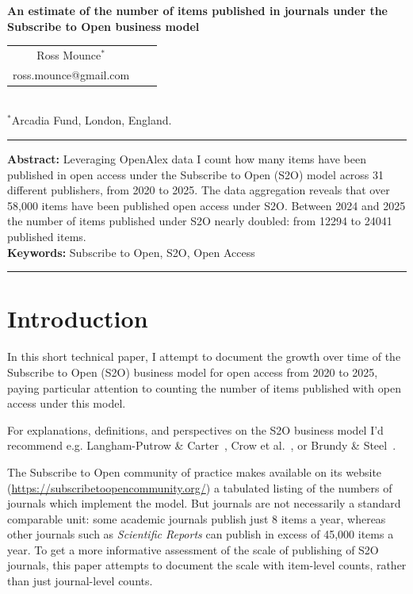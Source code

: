 \documentclass[10pt,a4paper]{article}
\begin{document}
\pagestyle{empty}
\begin{center}
{\Large\bf An estimate of the number of items published in journals under the Subscribe to Open business model  }\\[10pt]
\begin{tabular}{ccc}
Ross Mounce$^*$\\
ross.mounce@gmail.com
\end{tabular}\\[10pt]
$^*$Arcadia Fund, London, England.
\end{center}

\rule[1ex]{\textwidth}{.2pt}
{\bf Abstract:} Leveraging OpenAlex data I count how many items have been published in open access under the Subscribe to Open (S2O) model across 31 different publishers, from 2020 to 2025. The data aggregation reveals that over 58,000 items have been published open access under S2O. Between 2024 and 2025 the number of items published under S2O nearly doubled: from 12294 to 24041 published items. \smallskip \\

{\bf Keywords:} Subscribe to Open, S2O, Open Access

\rule[1ex]{\textwidth}{.2pt}
\section{Introduction}
In this short technical paper, I attempt to document the growth over time of the Subscribe to Open (S2O) business model for open access from 2020 to 2025, paying particular attention to counting the number of items published with open access under this model.

For explanations, definitions, and perspectives on the S2O business model I'd recommend e.g. Langham-Putrow \& Carter~\citep{langhamPutrow2020}, Crow et al.~\citep{crow2020}, or Brundy \& Steel~\citep{brundySteel2021}.

The Subscribe to Open community of practice makes available on its website (\url{https://subscribetoopencommunity.org/}) a tabulated listing of the numbers of journals which implement the model. But journals are not necessarily a standard comparable unit: some academic journals publish just 8 items a year, whereas other journals such as \textit{Scientific Reports} can publish in excess of 45,000 items a year. To get a more informative assessment of the scale of publishing of S2O journals, this paper attempts to document the scale with item-level counts, rather than just journal-level counts.
\end{document}
